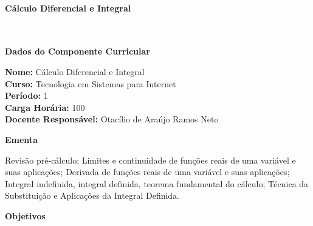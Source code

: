 \paragraph{Cálculo Diferencial e Integral}  \


\begin{snugshade}\begin{center}\textbf{
	Dados do Componente Curricular
}\end{center}\end{snugshade}

\noindent \textbf{Nome:} Cálculo Diferencial e Integral
\\        \textbf{Curso:} Tecnologia em Sistemas para Internet
\\        \textbf{Período:} \unit{1}{\degree}
\\        \textbf{Carga Horária:} \unit{100}{\hour}
\\        \textbf{Docente Responsável:} Otacílio de Araújo Ramos Neto      


\begin{snugshade}\begin{center}\textbf{
    Ementa
\vphantom{q}}\end{center}\end{snugshade}

\noindent
Revisão pré-cálculo; Limites e continuidade de funções reais de uma variável e suas aplicações; Derivada de funções reais de uma variável e suas aplicações; Integral indefinida, integral definida, teorema fundamental do cálculo; Técnica da Substituição e Aplicações da Integral Definida.

\begin{snugshade}\begin{center}\textbf{
    Objetivos
}\end{center}\end{snugshade}

